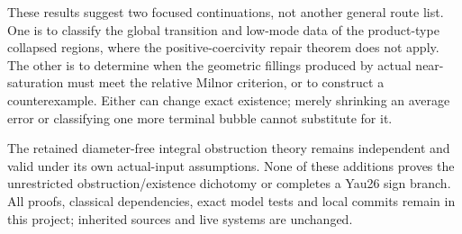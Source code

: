 \documentclass[
  11pt,
]{article}
\begin{document}
These results suggest two focused continuations, not another general
route list. One is to classify the global transition and low-mode data
of the product-type collapsed regions, where the positive-coercivity
repair theorem does not apply. The other is to determine when the
geometric fillings produced by actual near-saturation must meet the
relative Milnor criterion, or to construct a counterexample. Either can
change exact existence; merely shrinking an average error or classifying
one more terminal bubble cannot substitute for it.

The retained diameter-free integral obstruction theory remains
independent and valid under its own actual-input assumptions. None of
these additions proves the unrestricted obstruction/existence dichotomy
or completes a Yau26 sign branch. All proofs, classical dependencies,
exact model tests and local commits remain in this project; inherited
sources and live systems are unchanged.
\end{document}
